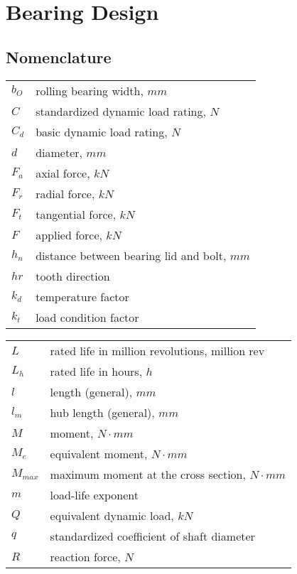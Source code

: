 \chapter{Bearing Design}
\section{Nomenclature}
\begin{tabular}[t]{lp{6.5cm}}
	$ b_O $ & rolling bearing width, $ \unit{mm}$\\
	$ C $ & standardized dynamic load rating, $ \unit{N} $\\
	$ C_d $ & basic dynamic load rating, $ \unit{N} $\\
	$ d $ & diameter, $ \unit{mm} $\\
	$ F_a $ & axial force, $ \unit{kN} $\\
	$ F_r $ & radial force, $ \unit{kN} $\\
	$ F_t $ & tangential force, $ \unit{kN} $\\
	$ F $ & applied force, $ \unit{kN} $\\
	$ h_n $ & distance between bearing lid and bolt, $ \unit{mm} $\\
	$ hr $ & tooth direction\\
	$ k_d $ & temperature factor\\
	$ k_t $ & load condition factor\\
	
\end{tabular}
\begin{tabular}[t]{lp{6.5cm}}
	$ L $ & rated life in million revolutions, $ \unit{\text{million rev}} $\\
	$ L_h $ & rated life in hours, $ \unit{h} $\\
	$ l $ & length (general), $ \unit{mm} $\\
	$ l_m $ & hub length (general), $ \unit{mm} $\\
	$ M $ & moment, $ \unit{N\cdot mm} $\\
	$ M_e $ & equivalent moment, $ \unit{N\cdot mm} $\\
	$ M_{max} $ & maximum moment at the cross section, $ \unit{N\cdot mm} $\\
	$ m $ & load-life exponent\\
	$ Q $ & equivalent dynamic load, $ \unit{kN} $\\
	$ q $ & standardized coefficient of shaft diameter\\
	$ R $ & reaction force, $ \unit{N} $\\
\end{tabular}\newpage
